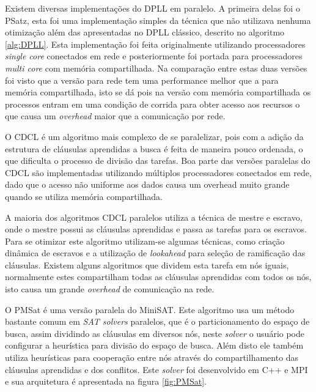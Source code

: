 \documentclass{ufsc-thesis}
\begin{document}
Existem diversas implementações do DPLL em paralelo. A primeira delas foi o PSatz\cite{Jurkowiak2005}, esta 
foi uma implementação simples da técnica que não utilizava nenhuma otimização além 
das apresentadas no DPLL clássico, descrito no algoritmo \ref{alg:DPLL}. Esta implementação 
foi feita originalmente utilizando processadores \textit{single core} conectados em rede 
e posteriormente foi portada para processadores \textit{multi core} com memória compartilhada\cite{holldobler2011short}.
Na comparação entre estas duas versões foi visto que a versão para rede tem uma performance 
melhor que a para memória compartilhada, isto se dá pois na versão 
com memória compartilhada os processos entram em uma condição de corrida para obter acesso 
aos recursos o que causa um \textit{overhead} maior que a comunicação por rede.


O CDCL é um algoritmo mais complexo de se paralelizar, pois com a adição da estrutura de 
cláusulas aprendidas a busca é feita de maneira pouco ordenada, o que dificulta o processo 
de divisão das tarefas. Boa parte das versões paralelas do CDCL são implementadas 
utilizando múltiplos processadores conectados em rede, dado que o acesso não uniforme 
aos dados causa um overhead muito grande quando se utiliza memória compartilhada. 

A maioria dos algoritmos CDCL paralelos utiliza a técnica de mestre e escravo, onde 
o mestre possui as cláusulas aprendidas e passa as tarefas para os escravos. Para se 
otimizar este algoritmo utilizam-se algumas técnicas, como criação dinâmica de escravos e 
a utilização de \textit{lookahead} para seleção de ramificação das cláusulas. Existem 
alguns algoritmos que dividem esta tarefa em nós iguais, normalmente estes compartilham 
todas as cláusulas aprendidas com todos os nós, isto causa um grande 
\textit{overhead} de comunicação na rede.

O PMSat\cite{Gil_pmsat} é uma versão paralela do MiniSAT\cite{Sorensson02minisat}. 
Este algoritmo usa um método bastante comum 
em \textit{SAT solvers} paralelos, que é o particionamento do espaço de busca, assim 
dividindo as cláusulas em diversos nós, neste \textit{solver} o usuário pode configurar 
a heurística para divisão do espaço de busca. Além disto ele também utiliza heurísticas para 
cooperação entre nós através do compartilhamento das cláusulas aprendidas e dos conflitos.
Este \textit{solver} foi desenvolvido em C++ e MPI e sua arquitetura é apresentada na figura \ref{fig:PMSat}.
\end{document}
